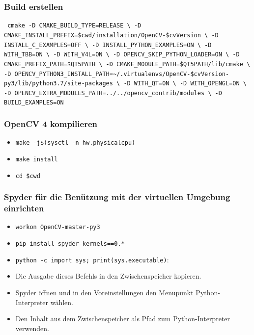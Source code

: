\subsubsection{Build erstellen} 
\texttt{
	cmake -D CMAKE\_BUILD\_TYPE=RELEASE \textbackslash \newline 
	-D CMAKE\_INSTALL\_PREFIX=\$cwd/installation/OpenCV-\grqq\$cvVersion \grqq \textbackslash \newline
	-D INSTALL\_C\_EXAMPLES=OFF \textbackslash \newline
	-D INSTALL\_PYTHON\_EXAMPLES=ON \textbackslash \newline
	-D WITH\_TBB=ON \textbackslash \newline
	-D WITH\_V4L=ON \textbackslash \newline
	-D OPENCV\_SKIP\_PYTHON\_LOADER=ON \textbackslash \newline
	-D CMAKE\_PREFIX\_PATH=\$QT5PATH \textbackslash \newline
	-D CMAKE\_MODULE\_PATH=\grqq\$QT5PATH\grqq/lib/cmake \textbackslash \newline
	-D OPENCV\_PYTHON3\_INSTALL\_PATH=\textasciitilde/.virtualenvs/OpenCV-\grqq\$cvVersion\grqq-py3/lib/python3.7/site-packages \textbackslash \newline
	-D WITH\_QT=ON \textbackslash \newline
	-D WITH\_OPENGL=ON \textbackslash \newline
	-D OPENCV\_EXTRA\_MODULES\_PATH=../../opencv\_contrib/modules \textbackslash \newline
	-D BUILD\_EXAMPLES=ON  \newline
}	

\subsubsection{OpenCV 4 kompilieren}
\begin{itemize}
 	\item \texttt{make -j\$(sysctl -n hw.physicalcpu)}
  	\item \texttt{make install}
 	\item \texttt{cd \$cwd} 	
\end{itemize}


\subsubsection{Spyder für die Benützung mit der virtuellen Umgebung einrichten}
\begin{itemize}
	\item \texttt{workon OpenCV-master-py3}	
	\item \texttt{pip install spyder-kernels==0.*}	
	\item \texttt{python -c \grqq import sys; print(sys.executable)\grqq}: 
	\item Die Ausgabe dieses Befehls in den Zwischenspeicher kopieren. \item Spyder öffnen und in den Voreinstellungen den Menupunkt \grqq Python-Interpreter\grqq{} wählen. 
	\item Den Inhalt aus dem Zwischenspeicher als Pfad zum Python-Interpreter verwenden.
\end{itemize}


